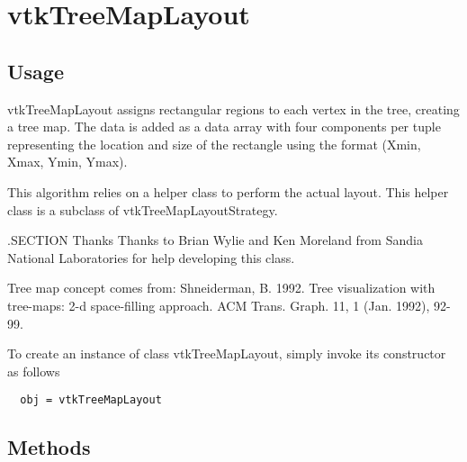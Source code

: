 \section{vtkTreeMapLayout}

\subsection{Usage}

 vtkTreeMapLayout assigns rectangular regions to each vertex in the tree,
 creating a tree map.  The data is added as a data array with four
 components per tuple representing the location and size of the
 rectangle using the format (Xmin, Xmax, Ymin, Ymax).

 This algorithm relies on a helper class to perform the actual layout.
 This helper class is a subclass of vtkTreeMapLayoutStrategy.

 .SECTION Thanks
 Thanks to Brian Wylie and Ken Moreland from Sandia National Laboratories
 for help developing this class.
 
 Tree map concept comes from:
 Shneiderman, B. 1992. Tree visualization with tree-maps: 2-d space-filling approach. 
 ACM Trans. Graph. 11, 1 (Jan. 1992), 92-99. 

To create an instance of class vtkTreeMapLayout, simply
invoke its constructor as follows
\begin{verbatim}
  obj = vtkTreeMapLayout
\end{verbatim}
\subsection{Methods}

